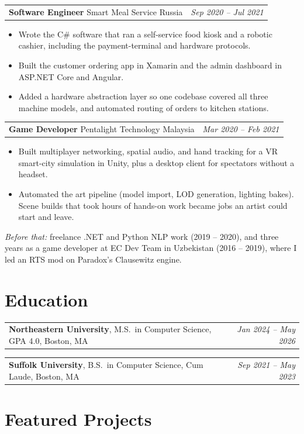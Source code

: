 \documentclass[letterpaper,11pt]{article}
\makeatletter
\newcommand{\educationEntry}[4]{%
    \vspace{2pt}\noindent
    \begin{tabular*}{\textwidth}{@{}l@{\extracolsep{\fill}}r@{}}
        \textbf{\color{accent}#1}, {\color{darktext}#2}, {\color{lighttext}#3} & \textit{\color{lighttext}#4} \\
    \end{tabular*}\par\vspace{-1pt}
}
\newcommand{\experienceEntry}[4]{%
    \vspace{3pt}\noindent
    \begin{tabular*}{\textwidth}{@{}l@{\extracolsep{\fill}}r@{}}
        \textbf{\color{darktext}#1} {\color{lighttext}\textbar} {\color{accent}#2} {\color{lighttext}\textbar} {\color{lighttext}#3} & \textit{\color{lighttext}#4} \\
    \end{tabular*}\vspace{-4pt}
}
\makeatother
\begin{document}
\experienceEntry{Software Engineer}{Smart Meal Service}{Russia}{Sep 2020 -- Jul 2021}
\begin{itemize}
    \item Wrote the C\# software that ran a self-service food kiosk and a robotic cashier, including the payment-terminal and hardware protocols.
    \item Built the customer ordering app in Xamarin and the admin dashboard in ASP.NET Core and Angular.
    \item Added a hardware abstraction layer so one codebase covered all three machine models, and automated routing of orders to kitchen stations.
\end{itemize}

\experienceEntry{Game Developer}{Pentalight Technology}{Malaysia}{Mar 2020 -- Feb 2021}
\begin{itemize}
    \item Built multiplayer networking, spatial audio, and hand tracking for a VR smart-city simulation in Unity, plus a desktop client for spectators without a headset.
    \item Automated the art pipeline (model import, LOD generation, lighting bakes). Scene builds that took hours of hands-on work became jobs an artist could start and leave.
\end{itemize}

\vspace{5pt}\noindent
{\color{lighttext}\textit{Before that:} freelance .NET and Python NLP work (2019 -- 2020), and three years as a game developer at EC Dev Team in Uzbekistan (2016 -- 2019), where I led an RTS mod on Paradox's Clausewitz engine.}

\section{Education}
\educationEntry{Northeastern University}{M.S.\ in Computer Science, GPA 4.0}{Boston, MA}{Jan 2024 -- May 2026}
\educationEntry{Suffolk University}{B.S.\ in Computer Science, Cum Laude}{Boston, MA}{Sep 2021 -- May 2023}

\section{Featured Projects}
\end{document}
